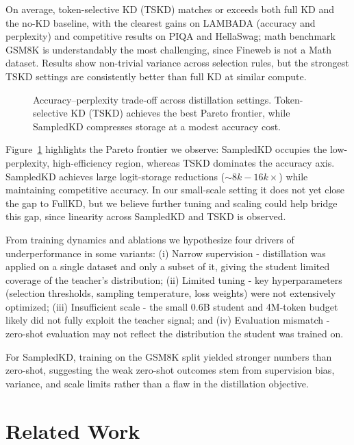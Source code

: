 \documentclass[11pt]{article}
\begin{document}
On average, token-selective KD (TSKD) matches or exceeds both full KD and the no-KD baseline, with the clearest gains on LAMBADA (accuracy and perplexity) and competitive results on PIQA and HellaSwag; math benchmark GSM8K is understandably the most challenging, since Fineweb is not a Math dataset.
Results show non-trivial variance across selection rules, but the strongest TSKD settings are consistently better than full KD at similar compute.

\begin{figure}[t]
\centering
\resizebox{\columnwidth}{!}{}
\caption{Accuracy--perplexity trade-off across distillation settings. Token-selective KD (TSKD) achieves the best Pareto frontier, while SampledKD compresses storage at a modest accuracy cost.}
\label{fig:acc-ppl}
\end{figure}

Figure~\ref{fig:acc-ppl} highlights the Pareto frontier we observe: SampledKD occupies the low-perplexity, high-efficiency region, whereas TSKD dominates the accuracy axis.
SampledKD achieves large logit-storage reductions ($\sim8k-16k\times$) while maintaining competitive accuracy.
In our small-scale setting it does not yet close the gap to FullKD, but we believe further tuning and scaling could help bridge this gap, since linearity across SampledKD and TSKD is observed.

From training dynamics and ablations we hypothesize four drivers of underperformance in some variants:
(i) Narrow supervision - distillation was applied on a single dataset and only a subset of it, giving the student limited coverage of the teacher's distribution;
(ii) Limited tuning - key hyperparameters (selection thresholds, sampling temperature, loss weights) were not extensively optimized;
(iii) Insufficient scale - the small 0.6B student and 4M-token budget likely did not fully exploit the teacher signal; and
(iv) Evaluation mismatch - zero-shot evaluation may not reflect the distribution the student was trained on.

For SampledKD, training on the GSM8K split yielded stronger numbers than zero-shot, suggesting the weak zero-shot outcomes stem from supervision bias, variance, and scale limits rather than a flaw in the distillation objective.

\section{Related Work}
\end{document}
